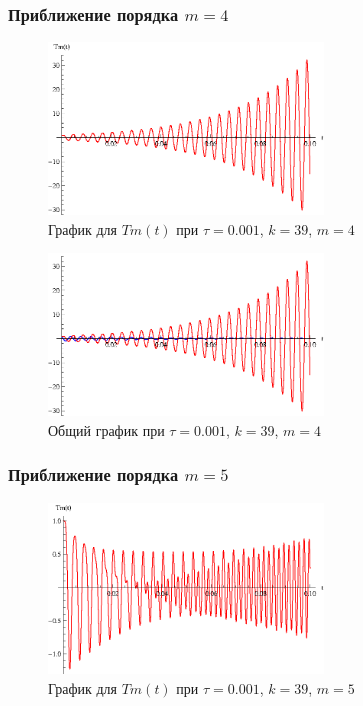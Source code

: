 \newpage

\subsubsection{Приближение порядка $m=4$}

\begin{figure}[h]
\begin{center}
\includegraphics[width=0.65\textwidth]{./3_results/3_8.eps}
\end{center}
\caption{График для $Tm(t)$ при $\tau=0.001$, $k=39$, $m=4$}
\end{figure}

\begin{figure}[h]
\begin{center}
\includegraphics[width=0.65\textwidth]{./3_results/3_9.eps}
\end{center}
\caption{Общий график при $\tau=0.001$, $k=39$, $m=4$}
\end{figure}

\newpage

\subsubsection{Приближение порядка $m=5$}

\begin{figure}[h]
\begin{center}
\includegraphics[width=0.65\textwidth]{./3_results/3_10.eps}
\end{center}
\caption{График для $Tm(t)$ при $\tau=0.001$, $k=39$, $m=5$}
\end{figure}

